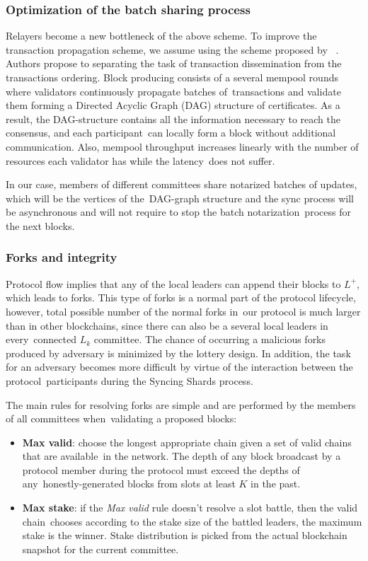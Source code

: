 \subsubsection{Optimization of the batch sharing process}

Relayers become a new bottleneck of the above scheme.
To improve the transaction propagation scheme, we assume using the scheme proposed by ~\cite{danezis2022narwhal}.
Authors propose to separating the task of transaction dissemination from the transactions ordering.
Block producing consists of a several mempool rounds where validators continuously propagate batches of\
transactions and validate them forming a Directed Acyclic Graph (DAG) structure of certificates.
As a result, the DAG-structure contains all the information necessary to reach the consensus, and each participant\
can locally form a block without additional communication.
Also, mempool throughput increases linearly with the number of resources each validator has while the latency\
does not suffer.

In our case, members of different committees share notarized batches of updates, which will be the vertices of the\
DAG-graph structure and the sync process will be asynchronous and will not require to stop the batch notarization\
process for the next blocks.

\subsubsection{Forks and integrity}\label{subsec:resolving-forks}

Protocol flow implies that any of the local leaders can append their blocks to $L^+$, which leads to forks.
This type of forks is a normal part of the protocol lifecycle, however, total possible number of the normal forks in\
our protocol is much larger than in other blockchains, since there can also be a several local leaders in every\
connected $L_k$ committee.
The chance of occurring a malicious forks produced by adversary is minimized by the lottery design.
In addition, the task for an adversary becomes more difficult by virtue of the interaction between the protocol\
participants during the Syncing Shards process.

The main rules for resolving forks are simple and are performed by the members of all committees when\
validating a proposed blocks:
\begin{itemize}
    \item \textbf{Max valid}: choose the longest appropriate chain given a set of valid chains that are available\
    in the network.
    The depth of any block broadcast by a protocol member during the protocol must exceed the depths of any\
    honestly-generated blocks from slots at least $K$ in the past.
    \item \textbf{Max stake}: if the \emph{Max valid} rule doesn't resolve a slot battle, then the valid chain\
    chooses according to the stake size of the battled leaders, the maximum stake is the winner.
    Stake distribution is picked from the actual blockchain snapshot for the current committee.
\end{itemize}

